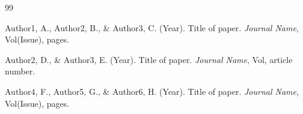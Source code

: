 \documentclass[a4paper,fleqn]{cas-dc}
\begin{document}
\printcredits



\begin{thebibliography}{99}

Author1, A., Author2, B., \& Author3, C. (Year).
Title of paper.
\textit{Journal Name}, Vol(Issue), pages.

Author2, D., \& Author3, E. (Year).
Title of paper.
\textit{Journal Name}, Vol, article number.

Author4, F., Author5, G., \& Author6, H. (Year).
Title of paper.
\textit{Journal Name}, Vol(Issue), pages.

\end{thebibliography}
\end{document}

